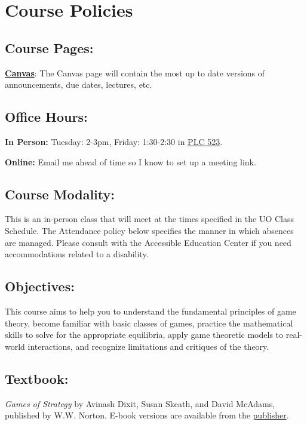 \section{Course Policies}
\subsection*{Course Pages:}

 \href{https://canvas.uoregon.edu/courses/233504}{\textbf{Canvas}}:
  The Canvas page will contain the most up to date versions of announcements, due dates, lectures, etc. 

\subsection*{Office Hours:} 

  \textbf{In Person:} Tuesday: 2-3pm, Friday: 1:30-2:30
  in \href{https://map.uoregon.edu/4f4d713e0}{PLC 523}.
  
  \textbf{Online:} Email me ahead of time so I know to set up a meeting link.

\subsection*{Course Modality:}

This is an in-person class that will meet at the times specified in the UO Class Schedule. The Attendance policy below specifies the manner in which absences are managed. Please consult with the Accessible Education Center if you need accommodations related to a disability.

\subsection*{Objectives:}

This course aims to help you to understand the fundamental principles of game theory, become familiar with basic classes of games, practice the mathematical skills to solve for the appropriate equilibria, apply game theoretic models to real-world interactions, and recognize limitations and critiques of the theory.

\subsection*{Textbook:}

  \textit{Games of Strategy} by Avinash Dixit, Susan Skeath, and David McAdams, published by W.W. Norton.
  E-book versions are available from the \href{https://wwnorton.com/books/Games-of-Strategy}{publisher}.
  
